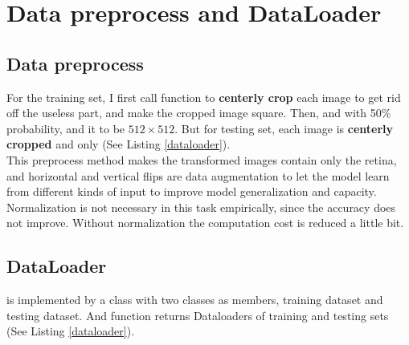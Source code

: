 \section{Data preprocess and DataLoader}
\indent
\subsection{Data preprocess}
	For the training set, I first call function  to \textbf{centerly crop} each image to get rid off the useless part, and 
    make the cropped image square. Then,  and  with 50\% probability, and 
     it to be $512 \times 512$. But for testing set, each image is \textbf{centerly cropped} and  only (See Listing \ref{dataloader}). \\
    This preprocess method makes the transformed images contain only the retina, and horizontal and vertical flips are data augmentation to let the model
    learn from different kinds of input to improve model generalization and capacity. \\
    Normalization is not necessary in this task empirically, since the accuracy does not improve. 
    Without normalization the computation cost is reduced a little bit.

\subsection{DataLoader}
	 is implemented by a class with two classes as members, training dataset and testing dataset. And 
     function returns Dataloaders of training and testing sets (See Listing \ref{dataloader}). \\
    
